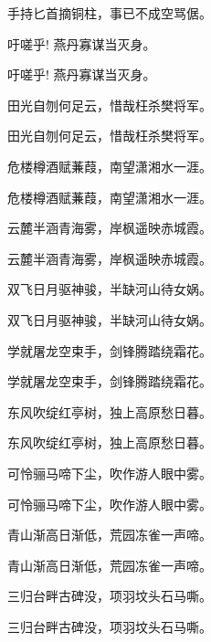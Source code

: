 \documentclass[12pt, a4paper, addpoints]{exam}
\begin{document}
\begin{questions}
\question[3] 手持匕首摘铜柱，事已不成空骂倨。

\question[3] 吁嗟乎! 燕丹寡谋当灭身。

\question[3] 吁嗟乎! 燕丹寡谋当灭身。

\question[3] 田光自刎何足云，惜哉枉杀樊将军。

\question[3] 田光自刎何足云，惜哉枉杀樊将军。

\question[3] 危楼樽酒赋蒹葭，南望潇湘水一涯。

\question[3] 危楼樽酒赋蒹葭，南望潇湘水一涯。

\question[3] 云麓半涵青海雾，岸枫遥映赤城霞。

\question[3] 云麓半涵青海雾，岸枫遥映赤城霞。

\question[3] 双飞日月驱神骏，半缺河山待女娲。

\question[3] 双飞日月驱神骏，半缺河山待女娲。

\question[3] 学就屠龙空束手，剑锋腾踏绕霜花。

\question[3] 学就屠龙空束手，剑锋腾踏绕霜花。

\question[3] 东风吹绽红亭树，独上高原愁日暮。

\question[3] 东风吹绽红亭树，独上高原愁日暮。

\question[3] 可怜骊马啼下尘，吹作游人眼中雾。

\question[3] 可怜骊马啼下尘，吹作游人眼中雾。

\question[3] 青山渐高日渐低，荒园冻雀一声啼。

\question[3] 青山渐高日渐低，荒园冻雀一声啼。

\question[3] 三归台畔古碑没，项羽坟头石马嘶。

\question[3] 三归台畔古碑没，项羽坟头石马嘶。

\end{questions}

\hspace{5cm}
\end{document}
